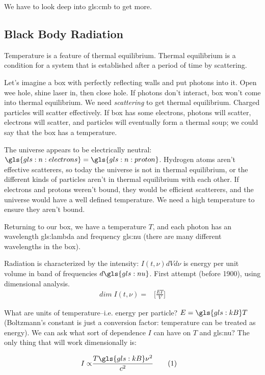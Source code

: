 \documentclass[]{article}
\newcommand\numberthis{\addtocounter{equation}{1}\tag{\theequation}}
\begin{document}
We have to look deep into \glsdesc{gls:cmb} to get more.

\subsection{Black Body Radiation}

Temperature is a feature of thermal equilibrium. Thermal equilibrium is a condition for a system that is established after a period of time by scattering.

Let's imagine a box with perfectly reflecting walls and put photons into it. Open wee hole, shine laser in, then close hole. If photons don't interact, box won't come into thermal equilibrium. We need \emph{scattering} to get thermal equilibrium. Charged particles will scatter effectively. If box has some electrons, photons will scatter, electrons will scatter, and particles will eventually form a thermal soup; we could say that the box has a temperature.

The universe appears to be electrically neutral: $\gls{gls:n:electrons}=\gls{gls:n:proton}$. Hydrogen atoms aren't effective scatterers, so today the universe is not in thermal equilibrium, or the different kinds of particles aren't in thermal equilibrium with each other. If electrons and protons weren't bound, they would be efficient scatterers, and the universe would have a well defined temperature. We need a high temperature to ensure they aren't bound.

Returning to our box, we have a temperature $T$, and each photon has an wavelength \gls{gls:lambda} and frequency \gls{gls:nu} (there are many different wavelengths in the box).

Radiation is characterized by the intensity: $I(t,\nu)dVd\nu$ is energy per unit volume in band of frequencies $d\gls{gls:nu}$. First attempt (before 1900), using dimensional analysis.
\begin{align*}
	dim \; I(t,\nu) =& \big[\frac{E T}{V}\big]
\end{align*}

What are units of temperature--i.e. energy per particle? $E = \gls{gls:kB}T$ (Boltzmann's constant is just a conversion factor: temperature can be treated as energy). We can ask what sort of dependence $I$ can have on $T$ and \gls{gls:nu}? The only thing that will work dimensionally is:


\begin{align*}
	I \propto & \frac{T \gls{gls:kB} \nu^2}{c^2} \numberthis \label{eq:raleigh:jeans}
\end{align*}
\end{document}
